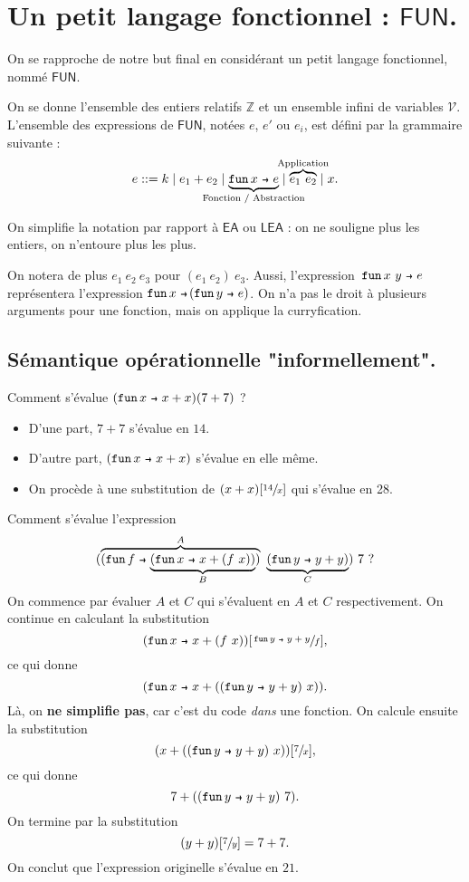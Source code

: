 \documentclass[../main]{subfiles}
\begin{document}
  \chapter{Un petit langage fonctionnel : $\mathsf{FUN}$.}
  \minitoc
  
  On se rapproche de notre but final en considérant un petit langage fonctionnel, nommé $\mathsf{FUN}$.

  On se donne l'ensemble des entiers relatifs $\mathds{Z}$ et un ensemble infini de variables $\mathcal{V}$.
  L'ensemble des expressions de $\mathsf{FUN}$, notées $e$, $e'$ ou $e_i$,  est défini 
  par la grammaire suivante :
  \[
    e ::= k  \mid e_1 + e_2  \mid \underbrace{\fun x e}_{\mathclap{\text{Fonction / Abstraction}}} \mid \overbrace{e_1\ e_2}^{\mathclap{\text{Application}}}  \mid x
  .\]

  \begin{note}
    On simplifie la notation par rapport à $\mathsf{EA}$ ou $\mathsf{LEA}$ : on ne souligne plus les entiers, on n'entoure plus les plus.

    On notera de plus $e_1\ e_2\ e_3$ pour $(e_1\ e_2)\ e_3$.
    Aussi, l'expression~$\fun {x\ y} e$ représentera l'expression $\fun x (\fun y e)$.
    On n'a pas le droit à plusieurs arguments pour une fonction, mais on applique la curryfication.
  \end{note}

  \section{Sémantique opérationnelle "informellement".}

  \begin{exm}
    Comment s'évalue $(\fun x x + x)(7 + 7)$ ?
    \begin{itemize}
      \item D'une part, $7 + 7$ s'évalue en $14$.
      \item D'autre part, $(\fun x x + x)$ s'évalue en elle même.
      \item On procède à une substitution de $(x + x)[\sfrac{14}{x}]$ qui s'évalue en 28.
    \end{itemize}
  \end{exm}

  \begin{exm}
    Comment s'évalue l'expression \[
      (\overbrace{(\fun f \underbrace{(\fun x x + (f\ x))}_B)}^A\ \underbrace{(\fun y y + y)}_C)\ 7\ 
    ?\]
    On commence par évaluer $A$ et $C$ qui s'évaluent en $A$ et $C$ respectivement.
    On continue en calculant la substitution 
    \[
      (\fun x x + (f\ x))[\sfrac{\fun y y + y}{f}]
    ,\] ce qui donne \[
      (\fun x x + ((\fun y y + y)\ x))
    .\]
    Là, on \textbf{ne simplifie pas}, car c'est du code \textit{dans} une fonction.
    On calcule ensuite la substitution \[
      (x + ((\fun y y + y)\ x))[\sfrac{7}{x}]
    ,\]
    ce qui donne \[
      7 + ((\fun y y + y)\ 7)
    .\]
    On termine par la substitution \[
      (y + y)[\sfrac{7}{y}] = 7 + 7
    .\]
    On conclut que l'expression originelle s'évalue en $21$.
      
  \end{exm}
\end{document}
